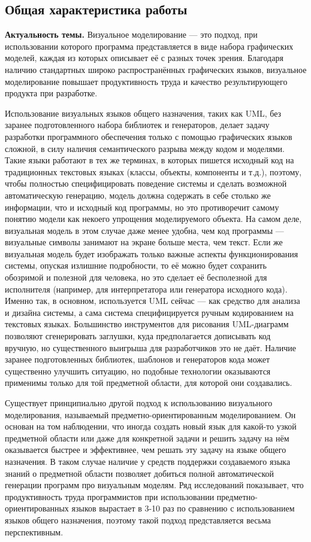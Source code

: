 \subsection*{\Large Общая характеристика работы}
\fontsize{14pt}{15pt}\selectfont
\textbf{Актуальность темы.}
Визуальное моделирование --- это подход, при использовании которого программа представляется 
в виде набора графических моделей, каждая из которых описывает её с разных точек 
зрения. Благодаря наличию стандартных широко распространённых графических языков, 
визуальное моделирование повышает продуктивность труда и качество результирующего 
продукта при разработке.

Использование визуальных языков общего назначения, таких как UML, без заранее 
подготовленного набора библиотек и генераторов, делает задачу разработки 
программного обеспечения только с помощью графических языков сложной, 
в силу наличия семантического разрыва между кодом и моделями. Такие языки работают в 
тех же терминах, в которых пишется исходный код на традиционных текстовых языках 
(классы, объекты, компоненты и т.д.), поэтому, чтобы полностью специфицировать 
поведение системы и сделать возможной автоматическую генерацию, модель должна 
содержать в себе столько же информации, что и исходный код программы, но это 
противоречит самому понятию модели как некоего упрощения моделируемого объекта. 
На самом деле, визуальная модель в этом случае даже менее удобна, чем код 
программы --- визуальные символы занимают на экране больше места, чем текст. 
Если же визуальная модель будет изображать только важные аспекты 
функционирования системы, опуская излишние подробности, то её можно будет 
сохранить обозримой и полезной для человека, но это сделает её бесполезной для 
исполнителя (например, для интерпретатора или генератора исходного кода). 
Именно так, в основном, используется UML сейчас --- как средство для анализа и 
дизайна системы, а сама система специфицируется ручным кодированием на текстовых 
языках. Большинство инструментов для рисования UML-диаграмм позволяют 
сгенерировать заглушки, куда предполагается дописывать код вручную, но 
существенного выигрыша для разработчиков это не даёт. Наличие заранее подготовленных 
библиотек, шаблонов и генераторов кода может существенно улучшить ситуацию, но подобные 
технологии оказываются применимы только для той предметной области, для которой они создавались.

Существует принципиально другой подход к использованию визуального 
моделирования, называемый предметно-ориентированным моделированием. Он основан на том наблюдении, что иногда создать новый 
язык для какой-то узкой предметной области или даже для конкретной задачи и решить задачу 
на нём оказывается быстрее и эффективнее, чем решать эту задачу на языке общего назначения. 
В таком случае наличие у средств поддержки создаваемого языка знаний о предметной области 
позволяет добиться полной автоматической генерации программ про визуальным моделям.
Ряд исследований показывает, что продуктивность труда программистов при использовании 
предметно-ориентированных языков вырастает в 3-10 раз по сравнению с 
использованием языков общего назначения, поэтому такой подход представляется 
весьма перспективным.

